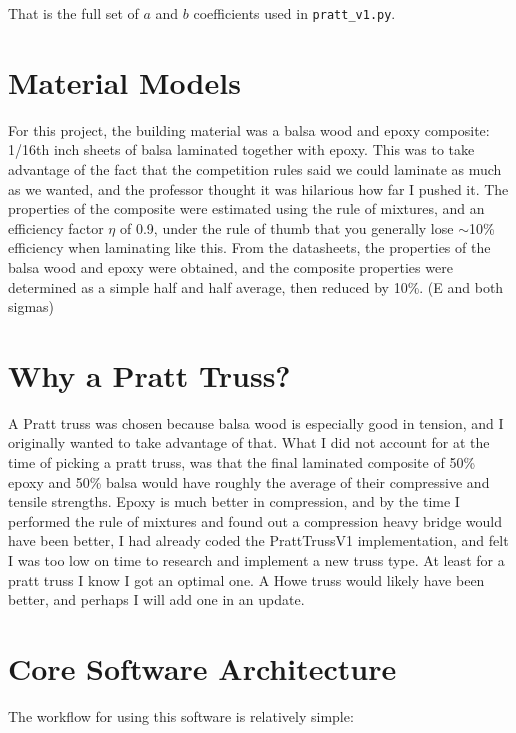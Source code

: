 \documentclass[11pt]{article}
\begin{document}
\medskip
That is the full set of $a$ and $b$ coefficients used in \texttt{pratt\_v1.py}.



\section{Material Models}

For this project, the building material was a balsa wood and epoxy composite: 1/16th inch sheets of balsa laminated together with epoxy. This was to take advantage of the fact that the competition rules said we could laminate as much as we wanted, and the professor thought it was hilarious how far I pushed it. The properties of the composite were estimated using the rule of mixtures, and an efficiency factor $\eta$ of 0.9, under the rule of thumb that you generally lose $\sim$10\% efficiency when laminating like this.
From the datasheets, the properties of the balsa wood and epoxy were obtained, and the composite properties were determined as a simple half and half average, then reduced by 10\%. (E and both sigmas)

\section{Why a Pratt Truss?}

A Pratt truss was chosen because balsa wood is especially good in tension, and I originally wanted to take advantage of that. What I did not account for at the time of picking a pratt truss, was that the final laminated composite of 50\% epoxy and 50\% balsa would have roughly the average of their compressive and tensile strengths. Epoxy is much better in compression, and by the time I performed the rule of mixtures and found out a compression heavy bridge would have been better, I had already coded the PrattTrussV1 implementation, and felt I was too low on time to research and implement a new truss type. At least for a pratt truss I know I got an optimal one. A Howe truss would likely have been better, and perhaps I will add one in an update.

\section{Core Software Architecture}
\label{sec:build}

The workflow for using this software is relatively simple:
\end{document}
